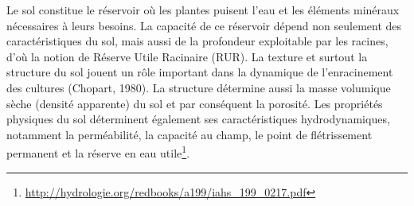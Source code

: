 \documentclass[a4paper,11pt]{article}
\begin{document}
Le sol constitue le réservoir où les plantes puisent l’eau et les
éléments minéraux nécessaires à leurs besoins. La capacité de ce
réservoir dépend non seulement des caractéristiques du sol, mais aussi
de la profondeur exploitable par les racines, d’où la notion de
Réserve Utile Racinaire (RUR). La texture et surtout la structure du
sol jouent un rôle important dans la dynamique de l’enracinement des
cultures (Chopart, 1980). La structure détermine aussi la masse
volumique sèche (densité apparente) du sol et par conséquent la
porosité. Les propriétés physiques du sol déterminent également ses
caractéristiques hydrodynamiques, notamment la perméabilité, la
capacité au champ, le point de flétrissement permanent et la réserve
en eau utile\footnote{\url{http://hydrologie.org/redbooks/a199/iahs_199_0217.pdf}}.



\end{document}
